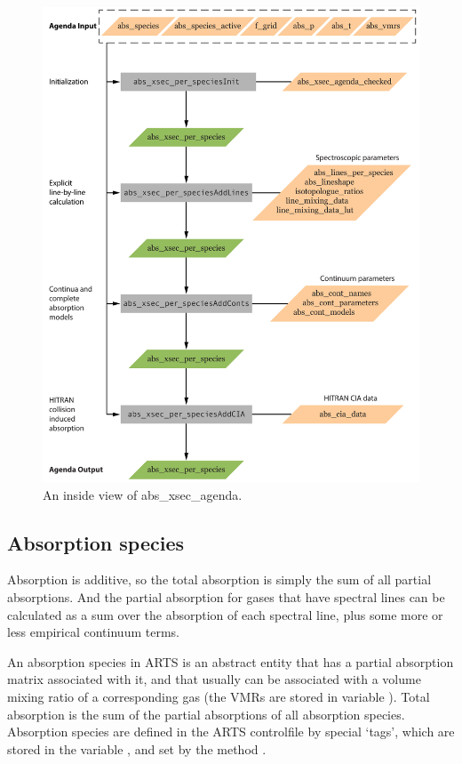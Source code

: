 \begin{figure}
 \begin{center}
  \includegraphics[scale=0.7]{abs_xsec_agenda}
  \caption{An inside view of abs\_xsec\_agenda.}
  \label{fig:absorption:xsec_inside}
 \end{center}
\end{figure}


\subsection{Absorption species}

Absorption is additive, so the total absorption is simply the sum of
all partial absorptions.  And the partial absorption for gases that
have spectral lines can be calculated as a sum over the absorption of
each spectral line, plus some more or less empirical continuum terms.

An absorption species in ARTS is an abstract entity that has a partial
absorption matrix associated with it, and that usually can be
associated with a volume mixing ratio of a corresponding gas (the VMRs
are stored in variable ). Total absorption is the
sum of the partial absorptions of all absorption species. Absorption
species are defined in the ARTS controlfile by special `tags', which
are stored in the variable , and set by the
method .

